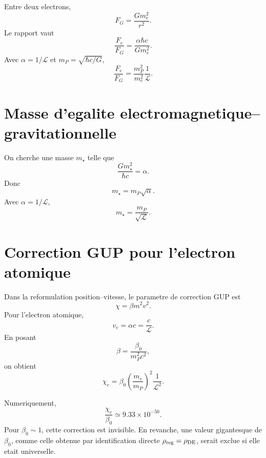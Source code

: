 \documentclass[11pt,a4paper]{article}
\newcommand{\cL}{\mathcal L}
\begin{document}
Entre deux electrons,
\begin{equation}
F_G=\frac{Gm_e^2}{r^2}.
\end{equation}
Le rapport vaut
\begin{equation}
\frac{F_e}{F_G}
=
\frac{\alpha\hbar c}{Gm_e^2}.
\end{equation}
Avec \(\alpha=1/\cL\) et \(m_P=\sqrt{\hbar c/G}\),
\begin{equation}
\boxed{
\frac{F_e}{F_G}
=
\frac{m_P^2}{m_e^2}\frac{1}{\cL}.
}
\end{equation}

\section{Masse d'egalite electromagnetique--gravitationnelle}

On cherche une masse \(m_\star\) telle que
\begin{equation}
\frac{Gm_\star^2}{\hbar c}=\alpha.
\end{equation}
Donc
\begin{equation}
m_\star=m_P\sqrt{\alpha}.
\end{equation}
Avec \(\alpha=1/\cL\),
\begin{equation}
\boxed{
m_\star=\frac{m_P}{\sqrt{\cL}}.
}
\end{equation}

\section{Correction GUP pour l'electron atomique}

Dans la reformulation position--vitesse, le parametre de correction GUP est
\begin{equation}
\chi=\beta m^2v^2.
\end{equation}
Pour l'electron atomique,
\begin{equation}
v_e=\alpha c=\frac{c}{\cL}.
\end{equation}
En posant
\begin{equation}
\beta=\frac{\beta_0}{m_P^2c^2},
\end{equation}
on obtient
\begin{equation}
\boxed{
\chi_e=\beta_0\left(\frac{m_e}{m_P}\right)^2\frac{1}{\cL^2}.
}
\end{equation}

Numeriquement,
\begin{equation}
\frac{\chi_e}{\beta_0}\simeq 9.33\times10^{-50}.
\end{equation}
Pour \(\beta_0\sim1\), cette correction est invisible. En revanche, une valeur
gigantesque de \(\beta_0\), comme celle obtenue par identification directe
\(\rho_{\rm reg}=\rho_{\rm DE}\), serait exclue si elle etait universelle.
\end{document}
